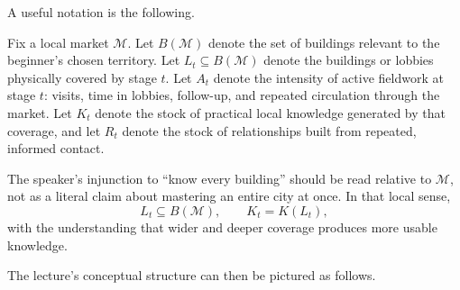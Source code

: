 A useful notation is the following.

\begin{definition}
Fix a local market \(\mathcal{M}\). Let \(B(\mathcal{M})\) denote the set of buildings relevant to the beginner's chosen territory. Let \(L_t \subseteq B(\mathcal{M})\) denote the buildings or lobbies physically covered by stage \(t\). Let \(A_t\) denote the intensity of active fieldwork at stage \(t\): visits, time in lobbies, follow-up, and repeated circulation through the market. Let \(K_t\) denote the stock of practical local knowledge generated by that coverage, and let \(R_t\) denote the stock of relationships built from repeated, informed contact.
\end{definition}

The speaker's injunction to ``know every building'' should be read relative to \(\mathcal{M}\), not as a literal claim about mastering an entire city at once. In that local sense,
\begin{equation}
L_t \subseteq B(\mathcal{M}), \qquad K_t = K(L_t),
\end{equation}
with the understanding that wider and deeper coverage produces more usable knowledge.

The lecture's conceptual structure can then be pictured as follows.

\begin{figure}
\centering
{}
\end{figure}

